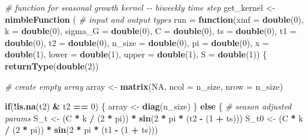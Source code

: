 \documentclass[
]{article}
\newenvironment{Shaded}{\begin{snugshade}}{\end{snugshade}}
\newcommand{\AttributeTok}[1]{\textcolor[rgb]{0.13,0.29,0.53}{#1}}
\newcommand{\CommentTok}[1]{\textcolor[rgb]{0.56,0.35,0.01}{\textit{#1}}}
\newcommand{\ConstantTok}[1]{\textcolor[rgb]{0.56,0.35,0.01}{#1}}
\newcommand{\ControlFlowTok}[1]{\textcolor[rgb]{0.13,0.29,0.53}{\textbf{#1}}}
\newcommand{\DecValTok}[1]{\textcolor[rgb]{0.00,0.00,0.81}{#1}}
\newcommand{\FunctionTok}[1]{\textcolor[rgb]{0.13,0.29,0.53}{\textbf{#1}}}
\newcommand{\NormalTok}[1]{#1}
\newcommand{\OtherTok}[1]{\textcolor[rgb]{0.56,0.35,0.01}{#1}}
\newcommand{\SpecialCharTok}[1]{\textcolor[rgb]{0.81,0.36,0.00}{\textbf{#1}}}
\begin{document}
\begin{Shaded}
\begin{Highlighting}[]
  \CommentTok{\# function for seasonal growth kernel {-}{-} biweekly time step}
\NormalTok{  get\_kernel }\OtherTok{\textless{}{-}} \FunctionTok{nimbleFunction}\NormalTok{ (}
    \CommentTok{\# input and output types}
    \AttributeTok{run =} \ControlFlowTok{function}\NormalTok{(}\AttributeTok{xinf =} \FunctionTok{double}\NormalTok{(}\DecValTok{0}\NormalTok{), }\AttributeTok{k =} \FunctionTok{double}\NormalTok{(}\DecValTok{0}\NormalTok{),}
                   \AttributeTok{sigma\_G =} \FunctionTok{double}\NormalTok{(}\DecValTok{0}\NormalTok{), }\AttributeTok{C =} \FunctionTok{double}\NormalTok{(}\DecValTok{0}\NormalTok{),}
                   \AttributeTok{ts =} \FunctionTok{double}\NormalTok{(}\DecValTok{0}\NormalTok{), }\AttributeTok{t1 =} \FunctionTok{double}\NormalTok{(}\DecValTok{0}\NormalTok{), }\AttributeTok{t2 =} \FunctionTok{double}\NormalTok{(}\DecValTok{0}\NormalTok{),}
                   \AttributeTok{n\_size =} \FunctionTok{double}\NormalTok{(}\DecValTok{0}\NormalTok{), }\AttributeTok{pi =} \FunctionTok{double}\NormalTok{(}\DecValTok{0}\NormalTok{), }\AttributeTok{x =} \FunctionTok{double}\NormalTok{(}\DecValTok{1}\NormalTok{),}
                   \AttributeTok{lower =} \FunctionTok{double}\NormalTok{(}\DecValTok{1}\NormalTok{), }\AttributeTok{upper =} \FunctionTok{double}\NormalTok{(}\DecValTok{1}\NormalTok{), }\AttributeTok{S =} \FunctionTok{double}\NormalTok{(}\DecValTok{1}\NormalTok{))}
\NormalTok{    \{}
      \FunctionTok{returnType}\NormalTok{(}\FunctionTok{double}\NormalTok{(}\DecValTok{2}\NormalTok{))}
      
      \CommentTok{\# create empty array}
\NormalTok{      array }\OtherTok{\textless{}{-}} \FunctionTok{matrix}\NormalTok{(}\ConstantTok{NA}\NormalTok{, }\AttributeTok{ncol =}\NormalTok{ n\_size, }\AttributeTok{nrow =}\NormalTok{ n\_size)}
      
      \ControlFlowTok{if}\NormalTok{(}\SpecialCharTok{!}\FunctionTok{is.na}\NormalTok{(t2) }\SpecialCharTok{\&}\NormalTok{ t2 }\SpecialCharTok{==} \DecValTok{0}\NormalTok{) \{}
\NormalTok{        array }\OtherTok{\textless{}{-}} \FunctionTok{diag}\NormalTok{(n\_size)}
\NormalTok{      \} }\ControlFlowTok{else}\NormalTok{ \{}
        \CommentTok{\# season adjusted params}
\NormalTok{        S\_t }\OtherTok{\textless{}{-}}\NormalTok{ (C }\SpecialCharTok{*}\NormalTok{ k }\SpecialCharTok{/}\NormalTok{ (}\DecValTok{2} \SpecialCharTok{*}\NormalTok{ pi)) }\SpecialCharTok{*} \FunctionTok{sin}\NormalTok{(}\DecValTok{2} \SpecialCharTok{*}\NormalTok{ pi }\SpecialCharTok{*}\NormalTok{ (t2 }\SpecialCharTok{{-}}\NormalTok{ (}\DecValTok{1} \SpecialCharTok{+}\NormalTok{ ts)))}
\NormalTok{        S\_t0 }\OtherTok{\textless{}{-}}\NormalTok{ (C }\SpecialCharTok{*}\NormalTok{ k }\SpecialCharTok{/}\NormalTok{ (}\DecValTok{2} \SpecialCharTok{*}\NormalTok{ pi)) }\SpecialCharTok{*} \FunctionTok{sin}\NormalTok{(}\DecValTok{2} \SpecialCharTok{*}\NormalTok{ pi }\SpecialCharTok{*}\NormalTok{ (t1 }\SpecialCharTok{{-}}\NormalTok{ (}\DecValTok{1} \SpecialCharTok{+}\NormalTok{ ts)))}
        

\end{Highlighting}
\end{Shaded}
\end{document}
